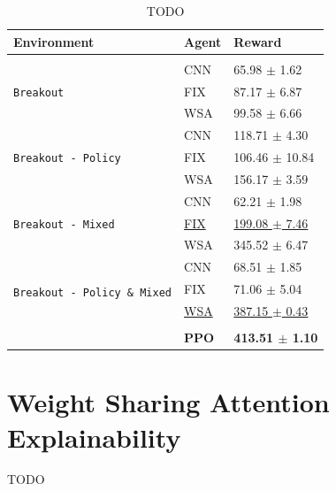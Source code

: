 \begin{table}[ht]
\centering
    \begin{tabular}[b]{lll}
                \multicolumn{1}{l}{Environment}  &\multicolumn{1}{l}{\bf Agent} &\multicolumn{1}{l}{\bf Reward} \\
                \hline \\


                \multirow{3}{*}{\texttt{Breakout}}
                                      & CNN & 65.98 $\pm$ 1.62 \\
                                      & FIX & 87.17 $\pm$ 6.87 \\
                                      & WSA & 99.58 $\pm$ 6.66 \\

                \multirow{3}{*}{\texttt{Breakout - Policy}}
                                      & CNN & 118.71 $\pm$ 4.30 \\
                                      & FIX & 106.46 $\pm$ 10.84 \\
                                      & WSA & 156.17 $\pm$ 3.59 \\

                \multirow{3}{*}{\texttt{Breakout - Mixed}}
                                      & CNN & 62.21 $\pm$ 1.98 \\
                                      & \underline{FIX} & \underline{199.08 $\pm$ 7.46}\\
                                      & WSA & 345.52 $\pm$ 6.47 \\

                \multirow{4}{*}{\texttt{Breakout - Policy \& Mixed}}
                                      & CNN & 68.51 $\pm$ 1.85 \\
                                      & FIX & 71.06 $\pm$ 5.04 \\
                                      & \underline{WSA} & \underline{387.15 $\pm$ 0.43} \\ \\


                                      & \textbf{PPO} & \textbf{413.51 $\pm$ 1.10}\\
    \end{tabular}
    \caption{TODO}
    \label{tab:breakout_results}
\end{table}




\section{Weight Sharing Attention Explainability}\label{sec:explainability}
TODO

